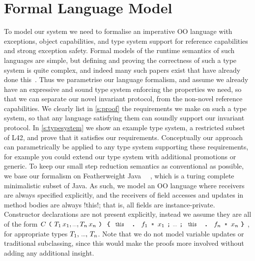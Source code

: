 \section{Formal Language Model}
\lstset{language=FortyFour} %
\label{s:formalism}
To model our system we need to formalise an imperative OO language
with exceptions, object capabilities, and type system
support for reference capabilities and strong exception safety.
Formal models of the runtime semantics of such languages are simple, but
defining and proving the correctness of such a type system 
is quite complex, and indeed many such papers exist that have already done this~\cite{ServettoEtAl13a,ServettoZucca15,GordonEtAl12,clebsch2015deny,JOT:issue_2011_01/article1}.
Thus we parametrise our language formalism, and assume we already have an expressive and sound type system enforcing the properties we need, so
that we can separate our novel invariant protocol, from the non-novel reference capabilities.
We clearly list in \autoref{s:proof} the requirements we make on such a type system, so that any language satisfying them can soundly support our invariant protocol.
In \autoref{s:typesystem} we show an example type system, a restricted subset of L42, and prove that it satisfies our requirements. Conceptually our approach can parametrically be applied to any type system supporting these requirements, for example you could extend our type system with additional promotions or generic.
To keep our small step reduction semantics as conventional as possible, we base our formalism on Featherweight Java~
\cite{IgarashiEtAl01}~\cite[Chapter~19]{pierce2002types}, which is a turing complete~\cite{10.1016/j.tcs.2013.08.017} minimalistic subset of Java.
As such, we model an OO language where receivers are always specified explicitly, and the receivers of field accesses and updates in method bodies are always \Q!this!; that is, all fields are instance-private.
Constructor declarations are not present explicitly, instead we assume they are all of the form $C\oR \drange{T}{x} \cR\oC \drange[\semicolon]{\Kw{this}\D f}{\Kw{=}\,x} \cC$, for appropriate types $\range[\text{, }]{T}$. %
Note that we do not model variable updates or traditional subclassing, since this would make the proofs more involved without adding any additional insight.

